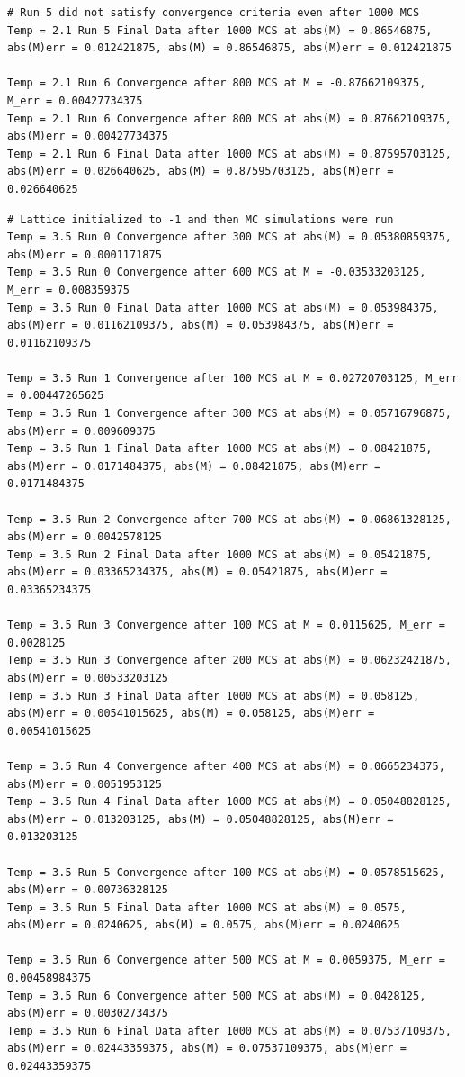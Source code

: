 \documentclass[a4paper,11pt]{article}
\begin{document}
\begin{lstlisting}[caption=Average Magnetization values for T 2.1]
# Run 5 did not satisfy convergence criteria even after 1000 MCS
Temp = 2.1 Run 5 Final Data after 1000 MCS at abs(M) = 0.86546875, abs(M)err = 0.012421875, abs(M) = 0.86546875, abs(M)err = 0.012421875

Temp = 2.1 Run 6 Convergence after 800 MCS at M = -0.87662109375, M_err = 0.00427734375
Temp = 2.1 Run 6 Convergence after 800 MCS at abs(M) = 0.87662109375, abs(M)err = 0.00427734375
Temp = 2.1 Run 6 Final Data after 1000 MCS at abs(M) = 0.87595703125, abs(M)err = 0.026640625, abs(M) = 0.87595703125, abs(M)err = 0.026640625
\end{lstlisting}
\begin{lstlisting}[caption=Average Magnetization values for T 3.5]
# Lattice initialized to -1 and then MC simulations were run
Temp = 3.5 Run 0 Convergence after 300 MCS at abs(M) = 0.05380859375, abs(M)err = 0.0001171875
Temp = 3.5 Run 0 Convergence after 600 MCS at M = -0.03533203125, M_err = 0.008359375
Temp = 3.5 Run 0 Final Data after 1000 MCS at abs(M) = 0.053984375, abs(M)err = 0.01162109375, abs(M) = 0.053984375, abs(M)err = 0.01162109375

Temp = 3.5 Run 1 Convergence after 100 MCS at M = 0.02720703125, M_err = 0.00447265625
Temp = 3.5 Run 1 Convergence after 300 MCS at abs(M) = 0.05716796875, abs(M)err = 0.009609375
Temp = 3.5 Run 1 Final Data after 1000 MCS at abs(M) = 0.08421875, abs(M)err = 0.0171484375, abs(M) = 0.08421875, abs(M)err = 0.0171484375

Temp = 3.5 Run 2 Convergence after 700 MCS at abs(M) = 0.06861328125, abs(M)err = 0.0042578125
Temp = 3.5 Run 2 Final Data after 1000 MCS at abs(M) = 0.05421875, abs(M)err = 0.03365234375, abs(M) = 0.05421875, abs(M)err = 0.03365234375

Temp = 3.5 Run 3 Convergence after 100 MCS at M = 0.0115625, M_err = 0.0028125
Temp = 3.5 Run 3 Convergence after 200 MCS at abs(M) = 0.06232421875, abs(M)err = 0.00533203125
Temp = 3.5 Run 3 Final Data after 1000 MCS at abs(M) = 0.058125, abs(M)err = 0.00541015625, abs(M) = 0.058125, abs(M)err = 0.00541015625

Temp = 3.5 Run 4 Convergence after 400 MCS at abs(M) = 0.0665234375, abs(M)err = 0.0051953125
Temp = 3.5 Run 4 Final Data after 1000 MCS at abs(M) = 0.05048828125, abs(M)err = 0.013203125, abs(M) = 0.05048828125, abs(M)err = 0.013203125

Temp = 3.5 Run 5 Convergence after 100 MCS at abs(M) = 0.0578515625, abs(M)err = 0.00736328125
Temp = 3.5 Run 5 Final Data after 1000 MCS at abs(M) = 0.0575, abs(M)err = 0.0240625, abs(M) = 0.0575, abs(M)err = 0.0240625

Temp = 3.5 Run 6 Convergence after 500 MCS at M = 0.0059375, M_err = 0.00458984375
Temp = 3.5 Run 6 Convergence after 500 MCS at abs(M) = 0.0428125, abs(M)err = 0.00302734375
Temp = 3.5 Run 6 Final Data after 1000 MCS at abs(M) = 0.07537109375, abs(M)err = 0.02443359375, abs(M) = 0.07537109375, abs(M)err = 0.02443359375
\end{lstlisting}
\clearpage
\end{document}
